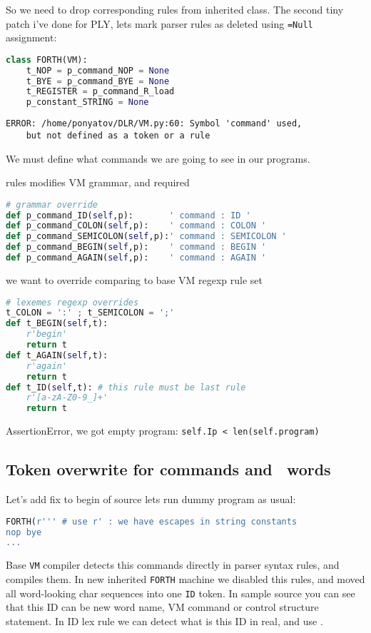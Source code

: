 So we need to drop corresponding rules
from inherited class.
The second tiny patch i've done for PLY, lets mark parser rules as deleted using
\verb|=Null| assignment:
\begin{lstlisting}[language=Python]
class FORTH(VM):
	t_NOP = p_command_NOP = None
 	t_BYE = p_command_BYE = None
 	t_REGISTER = p_command_R_load
 	p_constant_STRING = None
\end{lstlisting}
\begin{lstlisting}
ERROR: /home/ponyatov/DLR/VM.py:60: Symbol 'command' used,
	but not defined as a token or a rule
\end{lstlisting}
We must define what commands we are going to see in our programs.
\begin{description}[nosep]
\item[grammar] rules modifies VM grammar, and required
\begin{lstlisting}[language=Python]
# grammar override
def p_command_ID(self,p):		' command : ID '
def p_command_COLON(self,p):	' command : COLON '
def p_command_SEMICOLON(self,p):' command : SEMICOLON '
def p_command_BEGIN(self,p):	' command : BEGIN '
def p_command_AGAIN(self,p):	' command : AGAIN '
\end{lstlisting}
\item[lexemes] we want to override comparing to base VM regexp rule set
\begin{lstlisting}[language=Python]
# lexemes regexp overrides
t_COLON = ':' ; t_SEMICOLON = ';'
def t_BEGIN(self,t):
	r'begin'
	return t 
def t_AGAIN(self,t):
	r'again'
	return t
def t_ID(self,t): # this rule must be last rule
	r'[a-zA-Z0-9_]+'
	return t 
\end{lstlisting}
\end{description}
AssertionError, we got empty program:
\verb|self.Ip < len(self.program)|

\subsection{Token overwrite for commands and \F\ words}

Let's add fix to begin of source lets run dummy program as usual:
\begin{lstlisting}[language=Python]
FORTH(r''' # use r' : we have escapes in string constants
nop bye
...
\end{lstlisting}
Base \verb|VM| compiler detects this commands directly in parser syntax rules,
and compiles them. In new inherited \verb|FORTH| machine we disabled this rules,
and moved all word-looking char sequences into one \verb|ID| token. In sample
source you can see that this ID can be new word name, VM command or control
structure statement. In ID lex rule we can detect what is this ID in
real, and use .

